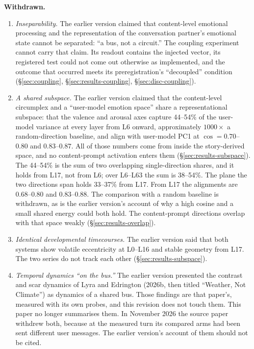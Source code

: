 \documentclass[11pt,a4paper]{article}
\begin{document}
\textbf{Withdrawn.}
\begin{enumerate}
  \item \textit{Inseparability.} The earlier version claimed that content-level emotional processing and the representation of the conversation partner's emotional state cannot be separated: ``a bus, not a circuit.'' The coupling experiment cannot carry that claim. Its readout contains the injected vector, its registered test could not come out otherwise as implemented, and the outcome that occurred meets its preregistration's ``decoupled'' condition (\S\ref{sec:coupling}, \S\ref{sec:results-coupling}, \S\ref{sec:disc-coupling}).
  \item \textit{A shared subspace.} The earlier version claimed that the content-level circumplex and a ``user-model emotion space'' share a representational subspace: that the valence and arousal axes capture 44--54\% of the user-model variance at every layer from L6 onward, approximately $1000\times$ a random-direction baseline, and align with user-model PC1 at $\cos = 0.70$--$0.80$ and $0.83$--$0.87$. All of those numbers come from inside the story-derived space, and no content-prompt activation enters them (\S\ref{sec:results-subspace}). The 44--54\% is the sum of two overlapping single-direction shares, and it holds from L17, not from L6; over L6--L63 the sum is 38--54\%. The plane the two directions span holds 33--37\% from L17. From L17 the alignments are $0.68$--$0.80$ and $0.83$--$0.88$. The comparison with a random baseline is withdrawn, as is the earlier version's account of why a high cosine and a small shared energy could both hold. The content-prompt directions overlap with that space weakly (\S\ref{sec:results-overlap}).
  \item \textit{Identical developmental timecourses.} The earlier version said that both systems show volatile eccentricity at L0--L16 and stable geometry from L17. The two series do not track each other (\S\ref{sec:results-subspace}).
  \item \textit{Temporal dynamics ``on the bus.''} The earlier version presented the contrast and scar dynamics of Lyra and Edrington (2026b, then titled ``Weather, Not Climate'') as dynamics of a shared bus. Those findings are that paper's, measured with its own probes, and this revision does not touch them. This paper no longer summarises them. In November 2026 the source paper withdrew both, because at the measured turn its compared arms had been sent different user messages. The earlier version's account of them should not be cited.

\end{enumerate}
\end{document}

